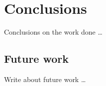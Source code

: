 \chapter{Conclusions}
\label{cha:conclusions}
\vspace{0.5 cm} 

Conclusions on the work done \dots

\vspace{0.5 cm} 
\section{Future work}
\label{sec:future}
\vspace{0.5 cm} 

Write about future work \dots
